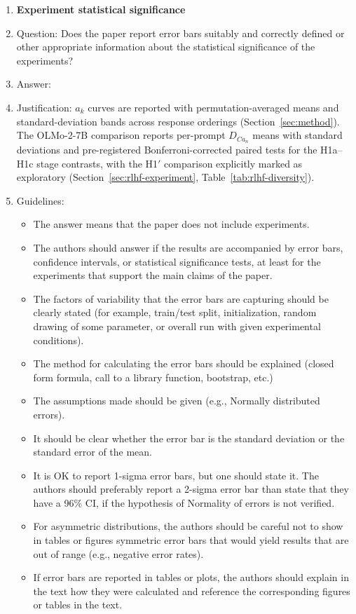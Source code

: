 \begin{enumerate}
\item {\bf Experiment statistical significance}
    \item[] Question: Does the paper report error bars suitably and correctly defined or other appropriate information about the statistical significance of the experiments?
    \item[] Answer: \answerYes{}
    \item[] Justification: $a_k$ curves are reported with permutation-averaged means and standard-deviation bands across response orderings (Section~\ref{sec:method}). The OLMo-2-7B comparison reports per-prompt $D_{Ca_n}$ means with standard deviations and pre-registered Bonferroni-corrected paired tests for the H1a--H1c stage contrasts, with the H1$'$ comparison explicitly marked as exploratory (Section~\ref{sec:rlhf-experiment}, Table~\ref{tab:rlhf-diversity}).
    \item[] Guidelines:
    \begin{itemize}
        \item The answer \answerNA{} means that the paper does not include experiments.
        \item The authors should answer \answerYes{} if the results are accompanied by error bars, confidence intervals, or statistical significance tests, at least for the experiments that support the main claims of the paper.
        \item The factors of variability that the error bars are capturing should be clearly stated (for example, train/test split, initialization, random drawing of some parameter, or overall run with given experimental conditions).
        \item The method for calculating the error bars should be explained (closed form formula, call to a library function, bootstrap, etc.)
        \item The assumptions made should be given (e.g., Normally distributed errors).
        \item It should be clear whether the error bar is the standard deviation or the standard error of the mean.
        \item It is OK to report 1-sigma error bars, but one should state it. The authors should preferably report a 2-sigma error bar than state that they have a 96\% CI, if the hypothesis of Normality of errors is not verified.
        \item For asymmetric distributions, the authors should be careful not to show in tables or figures symmetric error bars that would yield results that are out of range (e.g., negative error rates).
        \item If error bars are reported in tables or plots, the authors should explain in the text how they were calculated and reference the corresponding figures or tables in the text.
    \end{itemize}


\end{enumerate}
